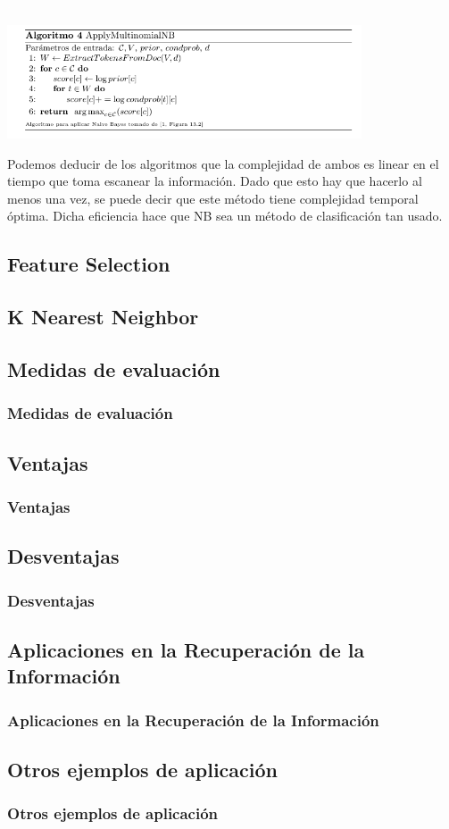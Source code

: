\documentclass[t,compress,10pt,xcolor=dvipsnames]{beamer}
\begin{document}
{		\framebreak
		
		
		\textcolor{white}{.}
		
		\vspace{3em}
		\includegraphics[width=10.5cm]{ApplyMN.png}
		
		
		\framebreak
		
		Podemos deducir de los algoritmos que la complejidad de ambos es linear en el tiempo que toma escanear la informaci\'on. Dado que esto hay que hacerlo al menos una vez, se puede decir que este m\'etodo tiene complejidad temporal \'optima. Dicha eficiencia hace que NB sea un m\'etodo de clasificaci\'on tan usado.
	}

	\subsection{Feature Selection}

	\subsection{K Nearest Neighbor}
	
	\subsection{Medidas de evaluaci\'on}
	\frame
	{
		\frametitle{Medidas de evaluaci\'on}	
	}
	
	\subsection{Ventajas}
	\frame
	{
		\frametitle{Ventajas}
	}
	
	\subsection{Desventajas}
	\frame
	{
		\frametitle{Desventajas}
	}
	
	\subsection{Aplicaciones en la Recuperaci\'on de la Informaci\'on}
	\frame
	{
		\frametitle{Aplicaciones en la Recuperaci\'on de la Informaci\'on}
	}
	
	\subsection{Otros ejemplos de aplicaci\'on}
	\frame
	{
		\frametitle{Otros ejemplos de aplicaci\'on}
	}

%
\end{document}
